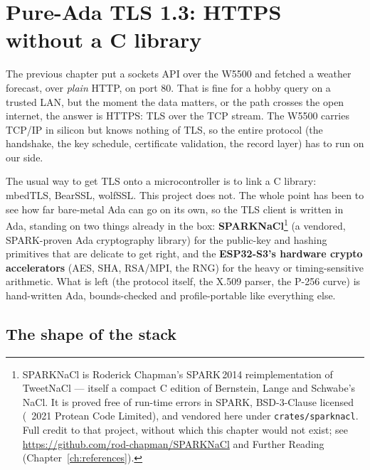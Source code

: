 \chapter{Pure-Ada TLS 1.3: HTTPS without a C library}
\label{ch:tls}

The previous chapter put a sockets API over the W5500 and fetched a weather
forecast, over \emph{plain} HTTP, on port 80. That is fine for a hobby query on
a trusted LAN, but the moment the data matters, or the path crosses the open
internet, the answer is HTTPS: TLS over the TCP stream. The W5500 carries TCP/IP
in silicon but knows nothing of TLS, so the entire protocol (the handshake, the
key schedule, certificate validation, the record layer) has to run on our side.

The usual way to get TLS onto a microcontroller is to link a C library: mbedTLS,
BearSSL, wolfSSL. This project does not. The whole point has been to see how far
bare-metal Ada can go on its own, so the TLS client is written in Ada, standing on
two things already in the box: \textbf{SPARKNaCl}\footnote{SPARKNaCl is Roderick
Chapman's SPARK\,2014 reimplementation of TweetNaCl --- itself a compact C edition
of Bernstein, Lange and Schwabe's NaCl. It is proved free of run-time errors in
SPARK, BSD-3-Clause licensed (\textcopyright~2021 Protean Code Limited), and
vendored here under \texttt{crates/sparknacl}. Full credit to that project, without
which this chapter would not exist; see \url{https://github.com/rod-chapman/SPARKNaCl}
and Further Reading (Chapter~\ref{ch:references}).} (a vendored, SPARK-proven Ada
cryptography library) for the public-key and hashing primitives that are
delicate to get right, and the \textbf{ESP32-S3's hardware crypto accelerators}
(AES, SHA, RSA/MPI, the RNG) for the heavy or timing-sensitive arithmetic. What is
left (the protocol itself, the X.509 parser, the P-256 curve) is hand-written
Ada, bounds-checked and profile-portable like everything else.


\section{The shape of the stack}
\label{ch:tls:stack}

